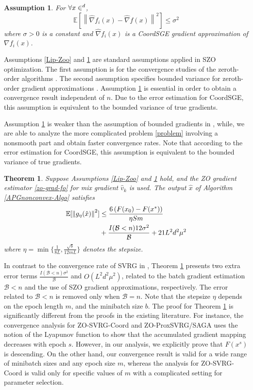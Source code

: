 \documentclass[iicol,sn-basic]{sn-jnl}
\theoremstyle{thmstyleone}%
\newtheorem{theorem}{Theorem}%
\theoremstyle{thmstyletwo}%
\theoremstyle{thmstylethree}%
\let\R\relax
\newcommand*{\R}{\mathbb{R}}
\newcommand*{\E}{\mathbb{E}}
\newcommand{\norm}[1]{\left\lVert#1\right\rVert}
\newtheorem{assumption}{Assumption}
\begin{document}
\begin{assumption}\label{Var-Zoo}
For $\forall x\in\R^d$, 
\[
\E\left[\norm{\hat{\nabla} f_i(x) - \hat{\nabla} f(x)}^2\right] \leq \sigma^2
\]
where $\sigma > 0$ is a constant and $\hat{\nabla} f_i(x)$ is a CoordSGE gradient approximation of $\nabla f_i(x)$.
\end{assumption}
Assumptions \ref{Lip-Zoo} and \ref{Var-Zoo} are standard assumptions applied in SZO optimization. The first assumption is for the convergence studies of the zeroth-order algorithms \cite{ghadimi2016accelerated,nesterov2017random,liu2018zeroth}. The second assumption specifies bounded variance for zeroth-order gradient approximations \cite{lian2016comprehensive,liu2018stochastic,liu2018zeroth}. 
Assumption \ref{Var-Zoo} is essential in order to obtain a convergence result independent of $n$. Due to the error estimation for CoordSGE, this assumption is equivalent to the bounded  variance of true gradients. 

Assumption \ref{Var-Zoo} is weaker than the assumption of bounded gradients in \cite{liu2017zeroth,hajinezhad2019zone},
while, we are able to analyze the more complicated problem \eqref{problem} involving a nonsmooth part and obtain faster convergence rates. Note that according to the error estimation for CoordSGE, this assumption is equivalent to the bounded  variance of true gradients.

\begin{theorem}\label{noncon-zoo-coord}
Suppose Assumptions \ref{Lip-Zoo} and \ref{Var-Zoo} hold, and the ZO gradient estimator \eqref{zo-grad-fo} for mix gradient $\hat{v}_k$ is used. The output $\hat{x}$ of Algorithm \ref{APGnonconvex-Algo} satisfies
\begin{align}
\E[\norm{g_{\eta}(\hat{x})}^2] & \leq \frac{6\left(F(x_0) - F({x}^*)\right)}{\eta Sm}\notag\\
& + \frac{I(\mathcal{B} < n)12\sigma ^2}{\mathcal{B}}+21{L^2 d^2 \mu^2}\notag
\end{align}
where $\eta = \min\{\frac{1}{8L}, \frac{\sqrt{b}}{12mL}\}$ denotes the stepsize.
\end{theorem}
In contrast to the convergence rate of SVRG in \cite{reddi2016proximal}, Theorem \ref{noncon-zoo-coord} presents two
extra error terms $\frac{I(\mathcal{B} < n)\sigma ^2}{\mathcal{B}}$ and $O(L^2d^2\mu^2)$, related to the batch gradient estimation $\mathcal{B} < n$ and the use of SZO gradient approximations, respectively. The error related to $\mathcal{B} < n$ is removed only when $\mathcal{B} = n$. Note that the stepsize  $\eta$ depends on the epoch length $m$, and the minibatch size $b$. The proof for Theorem \ref{noncon-zoo-coord} is
significantly different from the proofs in the existing literature. For instance, the convergence analysis for ZO-SVRG-Coord and ZO-ProxSVRG/SAGA uses the notion of the Lyapunov function to show that the accumulated gradient mapping decreases with epoch $s$. However, in our analysis, we explicitly prove that $F(x^s)$ is descending. On the other hand, our convergence result is valid for a wide range of minibatch sizes and any epoch size $m$, whereas the analysis for ZO-SVRG-Coord is valid only for specific values of $m$ with a complicated setting for parameter selection.
\end{document}
